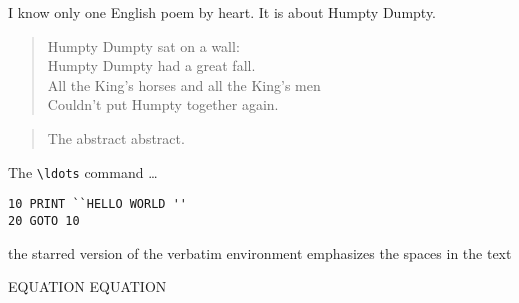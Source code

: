 \documentclass{article}
\begin{document}
I know only one English poem by
heart. It is about Humpty Dumpty.
\begin{flushleft}
  \begin{verse}
    Humpty Dumpty sat on a wall:\\
    Humpty Dumpty had a great fall.\\
    All the King’s horses and all
    the King’s men\\
    Couldn’t put Humpty together
    again.
  \end{verse}
\end{flushleft}


\begin{abstract}
  The abstract abstract.
\end{abstract}

The \verb|\ldots| command \ldots
\begin{verbatim}
10 PRINT ``HELLO WORLD ''
20 GOTO 10
\end{verbatim}

\begin{verbatim*}
the starred version of
the          verbatim
environment emphasizes
the spaces  in the text
\end{verbatim*}

\newpage
EQUATION
\newpage
EQUATION
\end{document}
